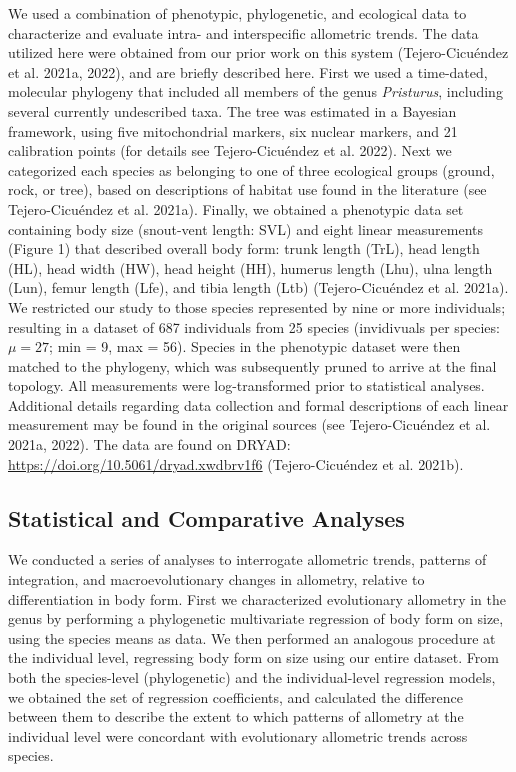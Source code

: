 \documentclass[
  11pt,
]{article}
\begin{document}
We used a combination of phenotypic, phylogenetic, and ecological data
to characterize and evaluate intra- and interspecific allometric trends.
The data utilized here were obtained from our prior work on this system
(Tejero-Cicuéndez et al. 2021a, 2022), and are briefly described here.
First we used a time-dated, molecular phylogeny that included all
members of the genus \emph{Pristurus}, including several currently
undescribed taxa. The tree was estimated in a Bayesian framework, using
five mitochondrial markers, six nuclear markers, and 21 calibration
points (for details see Tejero-Cicuéndez et al. 2022). Next we
categorized each species as belonging to one of three ecological groups
(ground, rock, or tree), based on descriptions of habitat use found in
the literature (see Tejero-Cicuéndez et al. 2021a). Finally, we obtained
a phenotypic data set containing body size (snout-vent length: SVL) and
eight linear measurements (Figure 1) that described overall body form:
trunk length (TrL), head length (HL), head width (HW), head height (HH),
humerus length (Lhu), ulna length (Lun), femur length (Lfe), and tibia
length (Ltb) (Tejero-Cicuéndez et al. 2021a). We restricted our study to
those species represented by nine or more individuals; resulting in a
dataset of 687 individuals from 25 species (invidivuals per species:
\(\mu=27\); min = 9, max = 56). Species in the phenotypic dataset were
then matched to the phylogeny, which was subsequently pruned to arrive
at the final topology. All measurements were log-transformed prior to
statistical analyses. Additional details regarding data collection and
formal descriptions of each linear measurement may be found in the
original sources (see Tejero-Cicuéndez et al. 2021a, 2022). The data are
found on DRYAD: \url{https://doi.org/10.5061/dryad.xwdbrv1f6}
(Tejero-Cicuéndez et al. 2021b).

\hypertarget{statistical-and-comparative-analyses}{%
\subsection{Statistical and Comparative
Analyses}\label{statistical-and-comparative-analyses}}

We conducted a series of analyses to interrogate allometric trends,
patterns of integration, and macroevolutionary changes in allometry,
relative to differentiation in body form. First we characterized
evolutionary allometry in the genus by performing a phylogenetic
multivariate regression of body form on size, using the species means as
data. We then performed an analogous procedure at the individual level,
regressing body form on size using our entire dataset. From both the
species-level (phylogenetic) and the individual-level regression models,
we obtained the set of regression coefficients, and calculated the
difference between them to describe the extent to which patterns of
allometry at the individual level were concordant with evolutionary
allometric trends across species. \hfill\break
\end{document}
